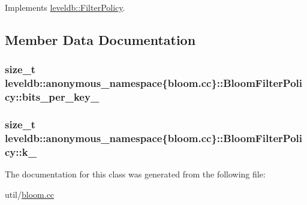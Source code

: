 Implements \hyperlink{classleveldb_1_1_filter_policy_afd5e951892a2e740f186c0658913ea1b}{leveldb\+::\+Filter\+Policy}.



\subsection{Member Data Documentation}
\hypertarget{classleveldb_1_1anonymous__namespace_02bloom_8cc_03_1_1_bloom_filter_policy_a0f840b2861ff8730b25dcea7fdefeda5}{}
\subsubsection[{bits\+\_\+per\+\_\+key\+\_\+}]{\setlength{\rightskip}{0pt plus 5cm}size\+\_\+t leveldb\+::anonymous\+\_\+namespace\{bloom.\+cc\}\+::Bloom\+Filter\+Policy\+::bits\+\_\+per\+\_\+key\+\_\+\hspace{0.3cm}{\ttfamily [private]}}\label{classleveldb_1_1anonymous__namespace_02bloom_8cc_03_1_1_bloom_filter_policy_a0f840b2861ff8730b25dcea7fdefeda5}
\hypertarget{classleveldb_1_1anonymous__namespace_02bloom_8cc_03_1_1_bloom_filter_policy_a4a7fd2e6ef015c423642e3a7a568a8bf}{}
\subsubsection[{k\+\_\+}]{\setlength{\rightskip}{0pt plus 5cm}size\+\_\+t leveldb\+::anonymous\+\_\+namespace\{bloom.\+cc\}\+::Bloom\+Filter\+Policy\+::k\+\_\+\hspace{0.3cm}{\ttfamily [private]}}\label{classleveldb_1_1anonymous__namespace_02bloom_8cc_03_1_1_bloom_filter_policy_a4a7fd2e6ef015c423642e3a7a568a8bf}


The documentation for this class was generated from the following file\+:\begin{DoxyCompactItemize}
\item 
util/\hyperlink{bloom_8cc}{bloom.\+cc}\end{DoxyCompactItemize}
